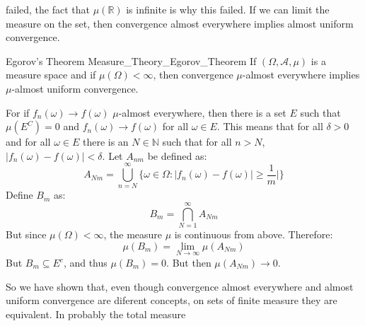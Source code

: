             failed, the fact that $\mu(\mathbb{R})$ is infinite
            is why this failed. If we can limit the measure on
            the set, then convergence almost everywhere implies
            almost uniform convergence.
            \begin{ftheorem}{Egorov's Theorem}
                            {Measure_Theory_Egorov_Theorem}
                If $(\Omega,\mathcal{A},\mu)$ is a measure
                space and if $\mu(\Omega)<\infty$, then
                convergence $\mu$-almost everywhere implies
                $\mu$-almost uniform convergence.
            \end{ftheorem}
            \begin{bproof}
                For if $f_{n}(\omega)\rightarrow{f(\omega)}$
                $\mu$-almost everywhere, then there is a set
                $E$ such that $\mu(E^{C})=0$ and
                $f_{n}(\omega)\rightarrow{f(\omega)}$ for all
                $\omega\in{E}$. This means that for all
                $\delta>0$ and for all $\omega\in{E}$ there is
                an $N\in\mathbb{N}$ such that for all $n>N$,
                $|f_{n}(\omega)-f(\omega)|<\delta$. Let $A_{nm}$
                be defined as:
                \begin{equation}
                    A_{Nm}=\bigcup_{n=N}^{\infty}\Big\{
                        \omega\in\Omega:
                        |f_{n}(\omega)-f(\omega)|\geq\frac{1}{m}|
                        \Big\}
                \end{equation}
                Define $B_{m}$ as:
                \begin{equation}
                    B_{m}=\bigcap_{N=1}^{\infty}A_{Nm}
                \end{equation}
                But since $\mu(\Omega)<\infty$, the measure
                $\mu$ is continuous from above. Therefore:
                \begin{equation}
                    \mu(B_{m})
                        =\underset{N\rightarrow\infty}{\lim}
                        \mu(A_{Nm})
                \end{equation}
                But $B_{m}\subseteq{E^{c}}$, and thus
                $\mu(B_{m})=0$. But then
                $\mu(A_{Nm})\rightarrow{0}$.
            \end{bproof}
            So we have shown that, even though convergence
            almost everywhere and almost uniform convergence
            are diferent concepts, on sets of finite measure
            they are equivalent. In probably the total measure
